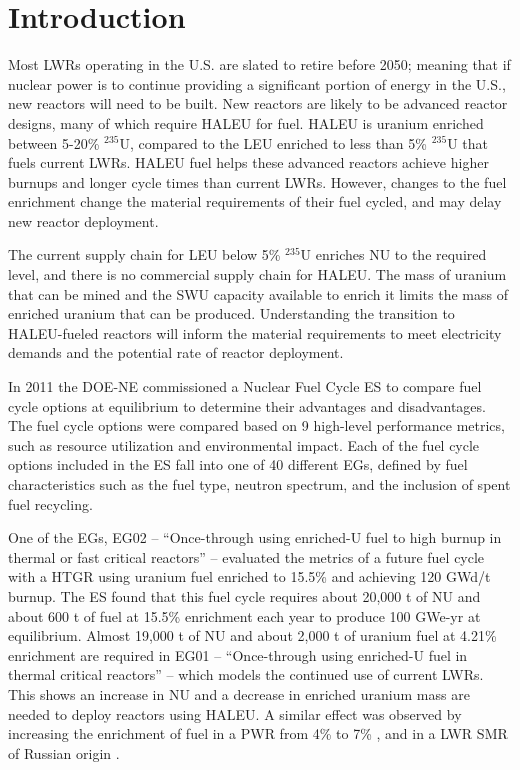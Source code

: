 \section{Introduction}

Most \glspl{LWR} operating in the U.S. are slated to retire
before 2050; meaning that if nuclear power is to continue providing a 
significant portion of energy in the U.S., new reactors will need to be built. 
New reactors are likely to be advanced reactor designs, many of 
which require \gls{HALEU} for fuel. \gls{HALEU} is uranium  
enriched between 5-20\% $^{235}$U, compared to the \gls{LEU} enriched to 
less than 5\% $^{235}$U that fuels current \glspl{LWR}. \gls{HALEU} fuel helps 
these advanced reactors achieve higher burnups and longer cycle times than current 
\glspl{LWR}. However, changes to the fuel enrichment change the material 
requirements of their fuel cycled, and may delay 
new reactor deployment.

The current supply chain for \gls{LEU} below 5\% $^{235}$U 
enriches \gls{NU} to the required level, and there is no commercial 
supply chain for \gls{HALEU}.  
The mass of uranium that can be mined and the \gls{SWU} capacity available 
to enrich it limits the mass of enriched uranium that can be 
produced. Understanding 
the transition to \gls{HALEU}-fueled reactors will inform the material 
requirements to meet electricity demands and 
the potential rate of reactor deployment.

In 2011 the \gls{DOE-NE} commissioned a Nuclear Fuel Cycle \gls{ES} 
\cite{wigeland_nuclear_2014} to compare fuel cycle options at equilibrium
to determine their advantages and disadvantages. The fuel cycle options were 
compared 
based on 9 high-level performance metrics, such as resource utilization and 
environmental impact. Each of the fuel cycle options included in the 
\gls{ES} fall into one of 40 different \glspl{EG}, defined by fuel 
characteristics such as the fuel type, neutron spectrum, and the inclusion 
of spent fuel recycling. 

One of the \glspl{EG}, \gls{EG}02 -- ``Once-through using enriched-U fuel to 
high burnup in thermal or fast critical reactors'' -- evaluated the metrics 
of a future fuel cycle with a \gls{HTGR} using uranium fuel enriched to 
15.5\% and achieving 120 GWd/t burnup. The \gls{ES} found that this fuel cycle
requires about 20,000 t of \gls{NU} and about 600 t of fuel at 15.5\% 
enrichment each year 
to produce 100 GWe-yr at equilibrium. Almost 19,000 t of \gls{NU} and 
about 2,000 t of uranium fuel at 4.21\%
enrichment are required in \gls{EG}01 -- ``Once-through using enriched-U 
fuel in thermal critical reactors'' -- which models the continued use of current 
\glspl{LWR}. This shows an increase in \gls{NU} and a decrease in enriched uranium 
mass are needed to deploy reactors using \gls{HALEU}.
A similar effect was observed by increasing the enrichment of fuel in a 
\gls{PWR} from 4\% to 7\% \cite{burns_reactor_2020}, and in a \gls{LWR}
\gls{SMR} of Russian origin \cite{hernandez_potential_2020}. 

